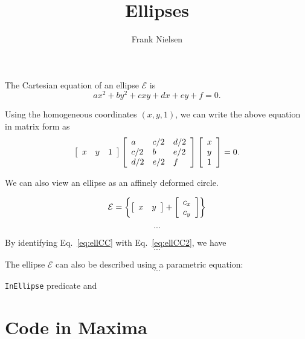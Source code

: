 \documentclass{article}
\title{Ellipses}
\author{Frank Nielsen}
\def\calE{\mathcal{E}}
\def\vectortwotranspose#1#2{{\left[\begin{array}{ll}#1 & #2 \end{array}\right]}}
\def\vectortwo#1#2{{\left[\begin{array}{l}#1 \cr #2 \end{array}\right]}}
\def\vectorthreetranspose#1#2#3{{\left[\begin{array}{lll}#1 & #2 & #3 \end{array}\right]}}
\def\vectorthree#1#2#3{{\left[\begin{array}{l}#1 \cr #2 \cr #3 \end{array}\right]}}
\def\matrixthree#1#2#3#4#5#6#7#8#9{{\left[\begin{array}{lll}#1 & #2 & #3\cr #4 & #5 & #6\cr #7 & #8 & #9 \end{array}\right]}}
\begin{document}
\maketitle

The Cartesian equation of an ellipse $\calE$ is
\begin{equation}\label{eq:ellCC}
ax^2+by^2+cxy+dx+ey+f=0.
\end{equation}

Using the homogeneous coordinates $(x,y,1)$, we can write the above equation in matrix form as
$$
\vectorthreetranspose{x}{y}{1}\, \matrixthree{a}{c/2}{d/2}{c/2}{b}{e/2}{d/2}{e/2}{f} \,  \vectorthree{x}{y}{1}=0.
$$

We can also view an ellipse as an affinely deformed circle.

$$
\calE=\left\{ \vectortwotranspose{x}{y}  + \vectortwo{c_x}{c_y} \right\}
$$ 

\begin{equation}\label{eq:ellCC2}
 ...
\end{equation}


By identifying Eq.~\ref{eq:ellCC} with Eq.~\ref{eq:ellCC2}, we have
$$
...
$$


The ellipse $\calE$ can also be described using a parametric equation:
\begin{equation}\label{eq:ellCC3}
 ...
\end{equation}


{\tt InEllipse} predicate and 


\section*{Code in {\sc Maxima}}
\end{document}
